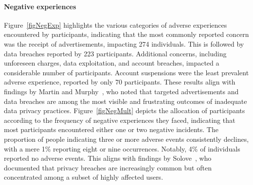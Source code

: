 \paragraph{Negative experiences}
Figure~\ref{figNegExp} highlights the various categories of adverse experiences encountered by participants, indicating that the most commonly reported concern was the receipt of advertisements, impacting 274 individuals.
This is followed by data breaches reported by 223 participants.
Additional concerns, including unforeseen charges, data exploitation, and account breaches, impacted a considerable number of participants.
Account suspensions were the least prevalent adverse experience, reported by only 70 participants. These results align with findings by Martin and Murphy~\cite{martin2017role}, who noted that targeted advertisements and data breaches are among the most visible and frustrating outcomes of inadequate data privacy practices.
Figure~\ref{figNegMult} depicts the allocation of participants according to the frequency of negative experiences they faced, indicating that most participants encountered either one or two negative incidents.
The proportion of people indicating three or more adverse events consistently declines, with a mere 1\% reporting eight or nine occurrences.
Notably, 4\% of individuals reported no adverse events.
This aligns with findings by Solove~\cite{solove2012introduction}, who documented that privacy breaches are increasingly common but often concentrated among a subset of highly affected users.






